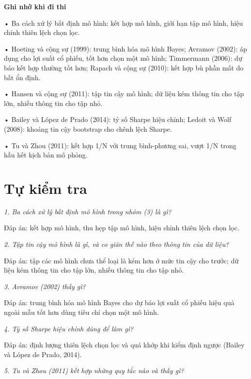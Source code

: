\begin{tcolorbox}[breakable]
\textbf{Ghi nhớ khi đi thi}

• Ba cách xử lý bất định mô hình: kết hợp mô hình, giới hạn tập mô hình, hiệu chỉnh thiên lệch chọn lọc.

• Hoeting và cộng sự (1999): trung bình hóa mô hình Bayes; Avramov (2002): áp dụng cho lợi suất cổ phiếu, tốt hơn chọn một mô hình; Timmermann (2006): dự báo kết hợp thường tốt hơn; Rapach và cộng sự (2010): kết hợp bù phần mất do bất ổn định.

• Hansen và cộng sự (2011): tập tin cậy mô hình; dữ liệu kém thông tin cho tập lớn, nhiều thông tin cho tập nhỏ.

• Bailey và López de Prado (2014): tỷ số Sharpe hiệu chỉnh; Ledoit và Wolf (2008): khoảng tin cậy bootstrap cho chênh lệch Sharpe.

• Tu và Zhou (2011): kết hợp 1/N với trung bình-phương sai, vượt 1/N trong hầu hết kịch bản mô phỏng.
\end{tcolorbox}

\section{Tự kiểm tra}

{\itshape 1. Ba cách xử lý bất định mô hình trong nhóm (3) là gì?\par}

Đáp án: kết hợp mô hình, thu hẹp tập mô hình, hiệu chỉnh thiên lệch chọn lọc.

{\itshape 2. Tập tin cậy mô hình là gì, và co giãn thế nào theo thông tin của dữ liệu?\par}

Đáp án: tập các mô hình chưa thể loại là kém hơn ở mức tin cậy cho trước; dữ liệu kém thông tin cho tập lớn, nhiều thông tin cho tập nhỏ.

{\itshape 3. Avramov (2002) thấy gì?\par}

Đáp án: trung bình hóa mô hình Bayes cho dự báo lợi suất cổ phiếu hiệu quả ngoài mẫu tốt hơn dùng tiêu chí chọn một mô hình.

{\itshape 4. Tỷ số Sharpe hiệu chỉnh dùng để làm gì?\par}

Đáp án: định lượng thiên lệch chọn lọc và quá khớp khi kiểm định ngược (Bailey và López de Prado, 2014).

{\itshape 5. Tu và Zhou (2011) kết hợp những quy tắc nào và thấy gì?\par}

